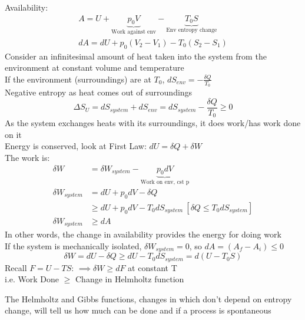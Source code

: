 \documentclass[a4paper, 11pt, normalem]{report}
\begin{document}
Availability:
\begin{gather*}
    A = U + \underbrace{p_0 V}_{\text{Work against env}} - \underbrace{T_0 S}_{\text{Env entropy change}} \\
    dA = dU + p_0 (V_2 - V_1) - T_0 (S_2 - S_1)
\end{gather*}
Consider an infinitesimal amount of heat taken into the system from the environment at constant volume and temperature \\
If the environment (surroundings) are at $T_0$, $dS_{env} = -\frac{\delta Q}{T_0}$ \\
Negative entropy as heat comes out of surroundings
\begin{equation*}
    \Delta S_U = dS_{system} + dS_{env} = dS_{system} - \frac{\delta Q}{T_0} \geq 0
\end{equation*}
As the system exchanges heats with its surroundings, it does work/has work done on it \\
Energy is conserved, look at First Law: $dU = \delta Q + \delta W$ \\
The work is:
\begin{align*}
    \delta W &= \delta W_{system} - \underbrace{p_0 dV}_{\text{Work on env, cst p}} \\
    \delta W_{system} &= dU + p_0 dV - \delta Q \\
    &\geq dU + p_0 dV - T_0 dS_{system} ~[\delta Q \leq T_0 dS_{system}] \\
    \delta W_{system} &\geq dA
\end{align*}
In other words, the change in availability provides the energy for doing work \\
If the system is mechanically isolated, $\delta W_{system} = 0$, so $dA = (A_{f} - A_{i}) \leq 0$
\begin{equation*}
    \delta W = dU - \delta Q \geq dU - T_0 dS_{system} = d(U - T_0 S)
\end{equation*}
Recall $F = U - TS$: $\implies \delta W \geq dF$ at constant T \\
i.e. Work Done $\geq$ Change in Helmholtz function

The Helmholtz and Gibbs functions, changes in which don't depend on entropy change, will tell us how much can be done and if a process is spontaneous
\end{document}
